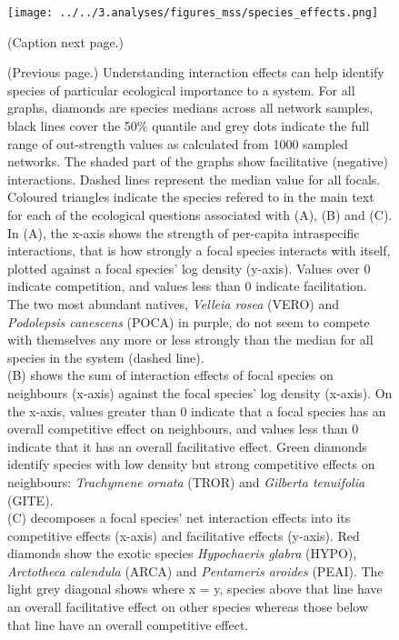 \documentclass[a4,12pt]{article}
\begin{document}
    \begin{figure}[H]
        \begin{centering}
        \texttt{[image: ../../3.analyses/figures\_mss/species\_effects.png]}
        \caption{(Caption next page.)}
        \label{fig:species}
        \end{centering}
    \end{figure} 

    \addtocounter{figure}{-1}
    \begin{figure} [t!]
        \caption{(Previous page.) Understanding interaction effects can help identify species of particular ecological importance to a system. For all graphs, diamonds are species medians across all network samples, black lines cover the 50\% quantile and grey dots indicate the full range of out-strength values as calculated from 1000 sampled networks. The shaded part of the graphs show facilitative (negative) interactions. Dashed lines represent the median value for all focals. Coloured triangles indicate the species refered to in the main text for each of the ecological questions associated with (A), (B) and (C). \\
        In (A), the x-axis shows the strength of per-capita intraspecific interactions, that is how strongly a focal species interacts with itself, plotted against a focal species' log density (y-axis). Values over $0$ indicate competition, and values less than $0$ indicate facilitation.  The two most abundant natives, \textit{Velleia rosea} (VERO) and \textit{Podolepsis canescens} (POCA) in purple, do not seem to compete with themselves any more or less strongly than the median for all species in the system (dashed line). \\
        (B) shows the sum of interaction effects of focal species on neighbours (x-axis) against the focal species' log density (x-axis). On the x-axis, values greater than $0$ indicate that a focal species has an overall competitive effect on neighbours, and values less than $0$ indicate that it has an overall facilitative effect. Green diamonds identify species with low density but strong competitive effects on neighbours: \textit{Trachymene ornata} (TROR) and \textit{Gilberta tenuifolia} (GITE). \\
        (C) decomposes a focal species' net interaction effects into its competitive effects (x-axis) and facilitative effects (y-axis). Red diamonds show the exotic species \textit{Hypochaeris glabra} (HYPO), \textit{Arctotheca calendula} (ARCA) and \textit{Pentameris aroides} (PEAI). The light grey diagonal shows where x = y, species above that line have an overall facilitative effect on other species whereas those below that line have an overall competitive effect.} 
    \end{figure}
\end{document}
